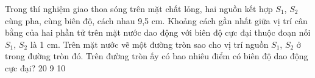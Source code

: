 \begin{vidu}%
Trong thí nghiệm giao thoa sóng trên mặt chất lỏng, hai nguồn kết hợp $S_1$, $S_2$  cùng pha, cùng biên độ, cách nhau 9,5 cm. Khoảng cách gần nhất giữa vị trí cân bằng của hai phần tử trên mặt nước dao động với biên độ cực đại thuộc đoạn nối $S_1$, $S_2$  là 1 cm. Trên mặt nước vẽ một đường tròn sao cho vị trí nguồn $S_1$, $S_2$ ở trong đường tròn đó. Trên đường tròn ấy có bao nhiêu điểm có biên độ dao động cực đại?
\choice
{20}
{9}
{}
{10}
\end{vidu} 






















